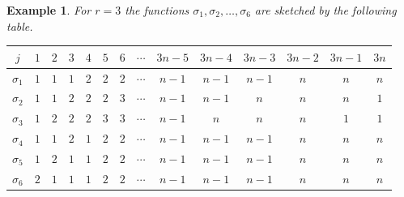 \documentclass[10pt,a4paper]{article}
\newtheorem{exa}[thm]{Example}\crefname{exa}{Example}{Examples}
\numberwithin{equation}{section}
\begin{document}
\begin{exa}\label{exa:sigmaCase3}
For $r = 3$ the functions $\sigma_1, \sigma_2, \ldots, \sigma_6$ are sketched by the following table.
	\begin{center}
	\begin{tabular}{|c||c|c|c|c|c|c|c|c|c|c|c|c|c|}
	\hline 
	$j$ & $1$ & $2$ & $3$ & $4$ & $5$ & $6$ & $\cdots$ & $3n -5$ & $3n - 4$ & $3n-3$ & $3n -2$ & $3n - 1$ & $3n$ \\ 
	\hline \hline
	$\sigma_1$ & \cellcolor{cyan}$1$ & \cellcolor{cyan}$1$ & \cellcolor{cyan}$1$ & \cellcolor{Yellow}$2$ & \cellcolor{Yellow}$2$ & \cellcolor{Yellow}$2$ & $\cdots$ & \cellcolor{YellowGreen}$n-1$ & \cellcolor{YellowGreen}$n-1$ & \cellcolor{YellowGreen}$n-1$ & \cellcolor{YellowOrange}$n$ & \cellcolor{YellowOrange}$n$ & \cellcolor{YellowOrange}$n$ \\
	\hline 
	$\sigma_2$ & \cellcolor{cyan}$1$ & \cellcolor{cyan}$1$ & \cellcolor{Yellow}$2$ & \cellcolor{Yellow}$2$ & \cellcolor{Yellow}$2$ & \cellcolor{Tan!70}$3$ & $\cdots$ & \cellcolor{YellowGreen}$n-1$ & \cellcolor{YellowGreen}$n-1$ & \cellcolor{YellowOrange}$n$ & \cellcolor{YellowOrange}$n$ & \cellcolor{YellowOrange}$n$ & \cellcolor{cyan}$1$ \\ 
	\hline 
	$\sigma_3$ & \cellcolor{cyan}$1$ & \cellcolor{Yellow}$2$ & \cellcolor{Yellow}$2$ & \cellcolor{Yellow}$2$ & \cellcolor{Tan!70}$3$ & \cellcolor{Tan!70}$3$ & $\cdots$ & \cellcolor{YellowGreen}$n-1$ & \cellcolor{YellowOrange}$n$ & \cellcolor{YellowOrange}$n$ & \cellcolor{YellowOrange}$n$ & \cellcolor{cyan}$1$ & \cellcolor{cyan}$1$ \\ 
	\hline \hline
	$\sigma_4$ & \cellcolor{cyan}$1$ & \cellcolor{cyan}$1$ & \cellcolor{Yellow}$2$ & \cellcolor{cyan}$1$ & \cellcolor{Yellow}$2$ & \cellcolor{Yellow}$2$ & $\cdots$ & \cellcolor{YellowGreen}$n-1$ & \cellcolor{YellowGreen}$n-1$ & \cellcolor{YellowGreen}$n-1$ & \cellcolor{YellowOrange}$n$ & \cellcolor{YellowOrange}$n$ & \cellcolor{YellowOrange}$n$ \\  
	\hline 
	$\sigma_5$ & \cellcolor{cyan}$1$ & \cellcolor{Yellow}$2$ & \cellcolor{cyan}$1$ & \cellcolor{cyan}$1$ & \cellcolor{Yellow}$2$ & \cellcolor{Yellow}$2$ & $\cdots$ & \cellcolor{YellowGreen}$n-1$ & \cellcolor{YellowGreen}$n-1$ & \cellcolor{YellowGreen}$n-1$ & \cellcolor{YellowOrange}$n$ & \cellcolor{YellowOrange}$n$ & \cellcolor{YellowOrange}$n$ \\ 
	\hline
	$\sigma_6$ & \cellcolor{Yellow}$2$ & \cellcolor{cyan}$1$ & \cellcolor{cyan}$1$ & \cellcolor{cyan}$1$ & \cellcolor{Yellow}$2$ & \cellcolor{Yellow}$2$ & $\cdots$ & \cellcolor{YellowGreen}$n-1$ & \cellcolor{YellowGreen}$n-1$ & \cellcolor{YellowGreen}$n-1$ & \cellcolor{YellowOrange}$n$ & \cellcolor{YellowOrange}$n$ & \cellcolor{YellowOrange}$n$ \\ 

\end{tabular}
\end{center}
\end{exa}
\end{document}
